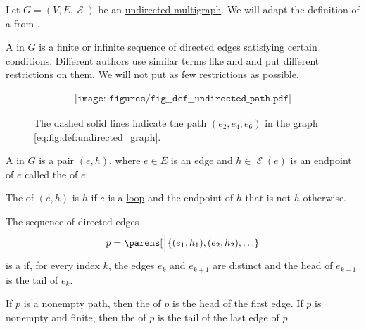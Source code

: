 \begin{definition}\label{def:undirected_multigraph_path}
  Let \( G = (V, E, \mscrE) \) be an \hyperref[def:undirected_graph]{undirected multigraph}. We will adapt the definition of a  from .

  A  in \( G \) is a finite or infinite sequence of directed edges satisfying certain conditions. Different authors use similar terms like  and  and put different restrictions on them. We will not put as few restrictions as possible.

  \begin{figure}
    \begin{equation}\label{eq:fig:def:undirected_path}
      \begin{aligned}
        \texttt{[image: figures/fig\_\_def\_\_undirected\_path.pdf]}
      \end{aligned}
    \end{equation}
    \caption{The dashed solid lines indicate the path \( (e_2, e_4, e_6) \) in the graph \eqref{eq:fig:def:undirected_graph}.}\label{fig:def:undirected_path}
  \end{figure}

  \begin{thmenum}
     A  in \( G \) is a pair \( (e, h) \), where \( e \in E \) is an edge and \( h \in \mscrE(e) \) is an endpoint of \( e \) called the  of \( e \).

    The  of \( (e, h) \) is \( h \) if \( e \) is a \hyperref[def:hypergraph/cardinality]{loop} and the endpoint of \( h \) that is not \( h \) otherwise.

     The sequence of directed edges
    \begin{equation}\label{eq:def:undirected_multigraph_path}
      p = \parens[\Big]{ (e_1, h_1), (e_2, h_2), \ldots }
    \end{equation}
    is a  if, for every index \( k \), the edges \( e_k \) and \( e_{k+1} \) are distinct and the head of \( e_{k+1} \) is the tail of \( e_k \).

     If \( p \) is a nonempty path, then the  of \( p \) is the head of the first edge. If \( p \) is nonempty and finite, then the  of \( p \) is the tail of the last edge of \( p \).


\end{thmenum}
\end{definition}
